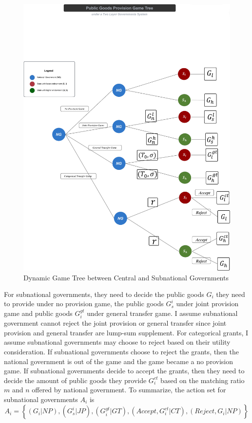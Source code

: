 \begin{itemize}
\begin{landscape}
    \begin{figure}[H]
        \centering
        \includegraphics[scale=0.041]{Chapter-2/Figures/tree.jpg}
        \caption[Dynamic Game Tree of 3 players]{Dynamic Game Tree between Central and Subnational Governments
            \texttt{} }
        \label{dynamicgamenoutility}
    \end{figure}
\end{landscape}

\newpage

For subnational governments, they need to decide the public goods $G_i$ they need to provide under no provision game, the public goods $G_s^i$ under joint provision game and public goods $G_i^{gt}$ under general transfer game. I assume subnational government cannot reject the joint provision or general transfer since joint provision and general transfer are lump-sum supplement. For categorical grants, I assume subnational governments may choose to reject based on their utility consideration. If subnational governments choose to reject the grants, then the national government is out of the game and the game became a no provision game. If subnational governments decide to accept the grants, then they need to decide the amount of public goods they provide $G_i^{ct}$ based on the matching ratio $m$ and $n$ offered by national government. To summarize, the action set for subnational governments $A_i$ is $$A_i=\left\{\left(G_i|NP\right),\left(G_s^i |J P \right),\left(G_i^{gt}|G T \right),\left(Accept,G_i^{ct}|C T\right), (Reject, G_i|NP)\right\} $$


\end{itemize}
